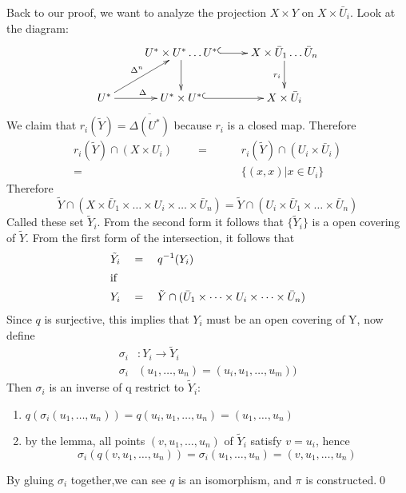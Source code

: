 \documentclass[a4paper]{article}
\theoremstyle{definition}
\theoremstyle{remark}
\begin{document}
\begin{enumerate}[itemindent=41pt,leftmargin=4pt,itemsep=0pt,parsep=0.2pt,label=$\bold{\qquad STEP \ \arabic{enumi}}$]
       \qquad Back to our proof, we want to analyze the projection $X\times Y$ on $X\times \bar U_i$. Look at the diagram:
       \begin{displaymath} \xymatrix{
                                                 &U^*\times U^* \dots U^* \ar@{^{(}->}[r] \ar[d]  &X\times \bar U_1 \dots \bar U_n \ar[d]_{r_i}        \\
        U^* \ar[r]^{\Delta}  \ar[ur]^{\Delta^n}  &U^*\times U^*  \ar@{^{(}->}[r]                  &X\times \bar U_i      }
       \end{displaymath}
       We claim that $r_i(\tilde Y) = \overline{\Delta(U^*)}$ because $r_i$ is a closed map. Therefore
        \begin{align*}
         r_i(\tilde Y)\cap(X\times U_i) \qquad =& \qquad r_i(\tilde Y)\cap(U_i \times \bar U_i) \\
                                         =& \qquad \{(x,x)|x \in U_i \}
       \end{align*}
       Therefore
        \[\tilde Y \cap (X\times \bar U_1 \times \dots \times U_i \times \dots \times \bar U_n)=  \tilde Y \cap (U_i\times \bar U_1 \times \dots \times \bar U_n)\]Called these set $\tilde Y_i$. From the second form it follows that $\{{\tilde Y_i\}}$ is a open covering of $\tilde Y$. From the first form of the intersection, it follows that
        \begin{align*}
        \tilde Y_i\quad&=\quad q^{-1}(Y_i)\\
        \intertext {if}
        Y_i\quad&=\quad\tilde Y \cap (\bar U_1 \times \dots \times U_i \times \dots \times \bar U_n)
        \end{align*}
        Since $q$ is surjective, this implies that $Y_i$ must be an open covering of Y, now define
        \begin{align*}
        \sigma_i&:Y_i\rightarrow \tilde Y_i \\
        \sigma_i&(u_1,\dots,u_n)=(u_i,u_1,\dots,u_m))
        \end{align*}
        Then $\sigma_i$ is an inverse of q restrict to $\tilde Y_i$:
        \begin{enumerate}
        \item $q(\sigma_i(u_1,\dots,u_n))=q(u_i,u_1,\dots,u_n)=(u_1,\dots,u_n)$
        \item by the lemma, all points $(v,u_1,\dots,u_n)$ of $\tilde Y_i$ satisfy $v=u_i$, hence \[\sigma_i(q(v,u_1,\dots,u_n))=\sigma_i(u_1,\dots,u_n)=(v,u_1,\dots,u_n)\]
        \end{enumerate}
        By gluing $\sigma_i$ together,we can see $q$ is an isomorphism, and $\pi$ is constructed.\qed\vspace{4ex}
        \end{enumerate}
\end{document}
